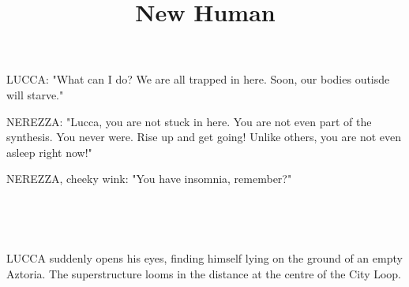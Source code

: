 \documentclass[11pt]{article}
\begin{document}
\ttfamily
\title{New Human}
\maketitle








LUCCA: "What can I do? 
We are all trapped in here. 
Soon, our bodies outisde will starve."

NEREZZA: "Lucca, you are not stuck in here. 
You are not even part of the synthesis.
You never were. 
Rise up and get going!
Unlike others, you are not even asleep right now!"

NEREZZA, cheeky wink: "You have insomnia, remember?"

\ 

\ 

LUCCA suddenly opens his eyes, finding himself lying on the ground of an empty Aztoria.
The superstructure looms in the distance at the centre of the City Loop.
\end{document}

